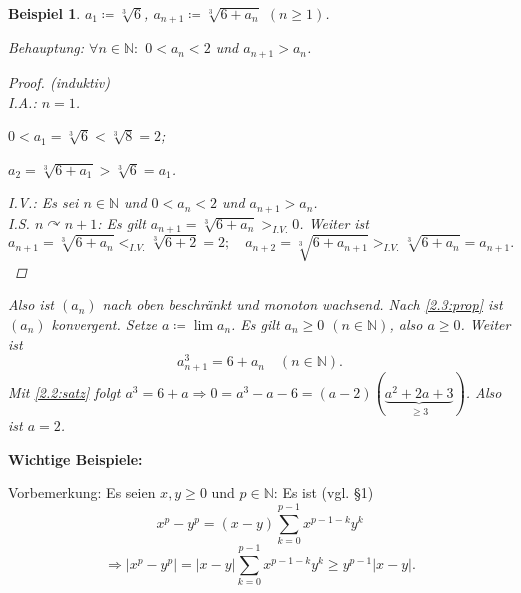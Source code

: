 \documentclass[12pt]{extreport} %
\newcommand{\N}{\mathbb{N}}
\theoremstyle{named}
\theoremstyle{itshape}
\theoremstyle{normal}
\newtheorem*{beispiel*}{Beispiel}
\begin{document}
\begin{beispiel*} $a_{1} \coloneqq \sqrt[3]{6}$, $a_{n + 1} \coloneqq \sqrt[3]{6 + a_{n}}$ $(n \geq 1)$.
	
	Behauptung: $\forall n \in \N:$ $0 < a_{n} < 2$ und $a_{n + 1} > a_{n}$.

	\begin{proof}(induktiv) \\
		I.A.: $n=1$. 
		\begin{description}
		\item $0 < a_{1} = \sqrt[3]{6} < \sqrt[3]{8} = 2$;
		\item $a_{2} = \sqrt[3]{6 + a_{1}} > \sqrt[3]{6} = a_{1}$.
	\end{description}
		
		I.V.: Es sei $n \in \N$ und $0 < a_{n} < 2$ und $a_{n+1} > a_{n}$. \\
		I.S. $n \curvearrowright n + 1$: Es gilt $a_{n + 1} = \sqrt[3]{6 + a_{n}} >_{I.V.} 0$. Weiter ist
		$$
			a_{n +1} = \sqrt[3]{6 + a_{n}} <_{I.V.} \sqrt[3]{6 + 2} = 2; \quad a_{n + 2} = \sqrt[3]{6 + a_{n+1}} >_{I.V.} \sqrt[3]{6 + a_{n}} = a_{n + 1}.
		$$
	\end{proof}
		Also ist  $(a_{n})$ nach oben beschränkt und monoton wachsend. Nach {\ref{2.3:prop}} ist $(a_{n})$ konvergent. 
		Setze $a \coloneqq \lim a_{n}$. Es gilt $a_{n} \geq 0$ $(n \in \N)$, also $a \geq 0$. Weiter ist
		$$
			a_{n+1}^{3} = 6 + a_{n} \quad (n \in \N).
		$$
		Mit {\ref{2.2:satz}} folgt $a^{3} = 6 + a \Rightarrow 0 = a^{3} - a - 6 = (a-2)(\underbrace{a^{2}+2a+3}_{\geq 3})$. Also ist $a = 2$.
\end{beispiel*}


\textbf{Wichtige Beispiele:} 


Vorbemerkung: Es seien $x, y \geq 0$ und $p \in \N$: Es ist (vgl. \S 1)
	$$ x^{p} - y^{p} = (x - y) \sum_{k = 0}^{p-1} x^{p-1-k}y^{k} $$
$$ \Rightarrow |x^{p} - y^{p}| = |x-y| \sum_{k=0}^{p-1} x^{p-1-k}y^{k} \geq y^{p-1} |x - y|.$$
\end{document}
